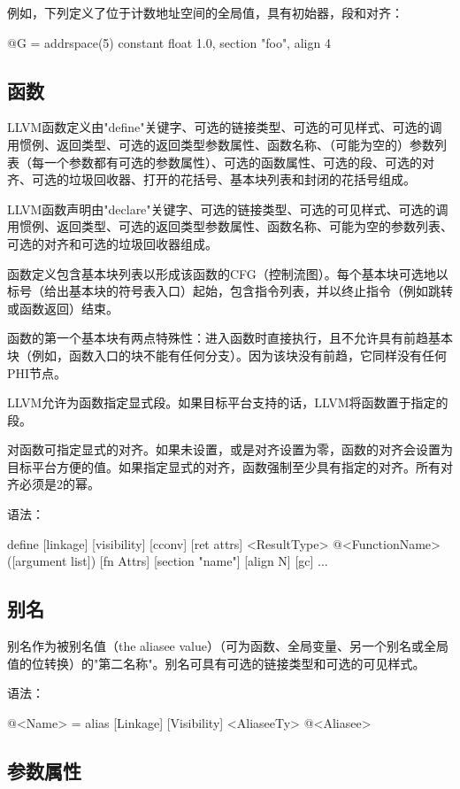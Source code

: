 \documentclass[12pt,a4paper]{article}
\begin{document}
例如，下列定义了位于计数地址空间的全局值，具有初始器，段和对齐：

@G = addrspace(5) constant float 1.0, section "foo", align 4

\subsection{函数}

LLVM函数定义由"define"关键字、可选的链接类型、可选的可见样式、可选的调用惯例、返回类型、可选的返回类型参数属性、函数名称、（可能为空的）参数列表（每一个参数都有可选的参数属性）、可选的函数属性、可选的段、可选的对齐、可选的垃圾回收器、打开的花括号、基本块列表和封闭的花括号组成。

LLVM函数声明由"declare"关键字、可选的链接类型、可选的可见样式、可选的调用惯例、返回类型、可选的返回类型参数属性、函数名称、可能为空的参数列表、可选的对齐和可选的垃圾回收器组成。

函数定义包含基本块列表以形成该函数的CFG（控制流图）。每个基本块可选地以标号（给出基本块的符号表入口）起始，包含指令列表，并以终止指令（例如跳转或函数返回）结束。

函数的第一个基本块有两点特殊性：进入函数时直接执行，且不允许具有前趋基本块（例如，函数入口的块不能有任何分支）。因为该块没有前趋，它同样没有任何PHI节点。

LLVM允许为函数指定显式段。如果目标平台支持的话，LLVM将函数置于指定的段。

对函数可指定显式的对齐。如果未设置，或是对齐设置为零，函数的对齐会设置为目标平台方便的值。如果指定显式的对齐，函数强制至少具有指定的对齐。所有对齐必须是2的幂。

语法：

define [linkage] [visibility] [cconv] [ret attrs] <ResultType> @<FunctionName> ([argument list]) [fn Attrs] [section "name"] [align N] [gc] { ... }

\subsection{别名}

别名作为被别名值（the aliasee value）（可为函数、全局变量、另一个别名或全局值的位转换）的"第二名称"。别名可具有可选的链接类型和可选的可见样式。

语法：

@<Name> = alias [Linkage] [Visibility] <AliaseeTy> @<Aliasee>

\subsection{参数属性}
\end{document}
